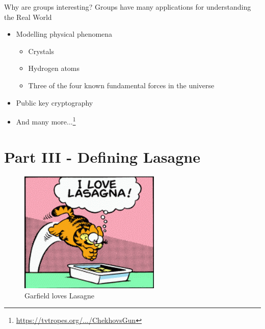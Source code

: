 \documentclass{beamer}
\begin{document}
\begin{frame}{Why are groups interesting?}
    Groups have many applications for understanding the Real World\texttrademark
    \begin{itemize}
        \item Modelling physical phenomena
        \begin{itemize}
            \item Crystals
            \item Hydrogen atoms
            \item Three of the four known fundamental forces in the universe
        \end{itemize}
        \item Public key cryptography
        \item And many more...\footnote{\href{https://tvtropes.org/pmwiki/pmwiki.php/Main/ChekhovsGun}{https://tvtropes.org/.../ChekhovsGun}}
    \end{itemize}
\end{frame}


\section{Part III - Defining Lasagne}


\begin{frame}
    \begin{figure}
        \includegraphics[width=0.6\textwidth]{images/defining_lasagne/Garfield_Loves_Lasagna.png}
        \caption{\label{fig:garfield-loves-lasagne}Garfield loves Lasagne \cite{garfield_lasagna}}
    \end{figure}
\end{frame}
\end{document}

